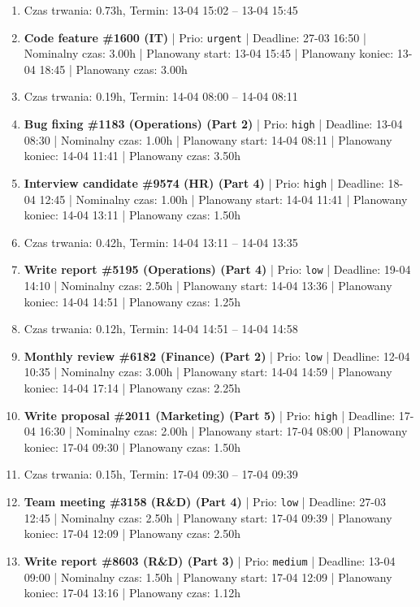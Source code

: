 {\begin{enumerate}
  \item [\textbf{PRZERWA}] Czas trwania: 0.73h, Termin: 13-04 15:02 -- 13-04 15:45
  \item [\textbf{14605}] \textbf{Code feature \#1600 (IT)} | Prio: \texttt{urgent} | Deadline: 27-03 16:50 | Nominalny czas: 3.00h | Planowany start: 13-04 15:45 | Planowany koniec: 13-04 18:45 | Planowany czas: 3.00h
  \item [\textbf{PRZERWA}] Czas trwania: 0.19h, Termin: 14-04 08:00 -- 14-04 08:11
  \item [\textbf{14613}] \textbf{Bug fixing \#1183 (Operations) (Part 2)} | Prio: \texttt{high} | Deadline: 13-04 08:30 | Nominalny czas: 1.00h | Planowany start: 14-04 08:11 | Planowany koniec: 14-04 11:41 | Planowany czas: 3.50h
  \item [\textbf{14612}] \textbf{Interview candidate \#9574 (HR) (Part 4)} | Prio: \texttt{high} | Deadline: 18-04 12:45 | Nominalny czas: 1.00h | Planowany start: 14-04 11:41 | Planowany koniec: 14-04 13:11 | Planowany czas: 1.50h
  \item [\textbf{PRZERWA}] Czas trwania: 0.42h, Termin: 14-04 13:11 -- 14-04 13:35
  \item [\textbf{14687}] \textbf{Write report \#5195 (Operations) (Part 4)} | Prio: \texttt{low} | Deadline: 19-04 14:10 | Nominalny czas: 2.50h | Planowany start: 14-04 13:36 | Planowany koniec: 14-04 14:51 | Planowany czas: 1.25h
  \item [\textbf{PRZERWA}] Czas trwania: 0.12h, Termin: 14-04 14:51 -- 14-04 14:58
  \item [\textbf{14690}] \textbf{Monthly review \#6182 (Finance) (Part 2)} | Prio: \texttt{low} | Deadline: 12-04 10:35 | Nominalny czas: 3.00h | Planowany start: 14-04 14:59 | Planowany koniec: 14-04 17:14 | Planowany czas: 2.25h
  \item [\textbf{14628}] \textbf{Write proposal \#2011 (Marketing) (Part 5)} | Prio: \texttt{high} | Deadline: 17-04 16:30 | Nominalny czas: 2.00h | Planowany start: 17-04 08:00 | Planowany koniec: 17-04 09:30 | Planowany czas: 1.50h
  \item [\textbf{PRZERWA}] Czas trwania: 0.15h, Termin: 17-04 09:30 -- 17-04 09:39
  \item [\textbf{14688}] \textbf{Team meeting \#3158 (R\&D) (Part 4)} | Prio: \texttt{low} | Deadline: 27-03 12:45 | Nominalny czas: 2.50h | Planowany start: 17-04 09:39 | Planowany koniec: 17-04 12:09 | Planowany czas: 2.50h
  \item [\textbf{14634}] \textbf{Write report \#8603 (R\&D) (Part 3)} | Prio: \texttt{medium} | Deadline: 13-04 09:00 | Nominalny czas: 1.50h | Planowany start: 17-04 12:09 | Planowany koniec: 17-04 13:16 | Planowany czas: 1.12h

\end{enumerate}}
